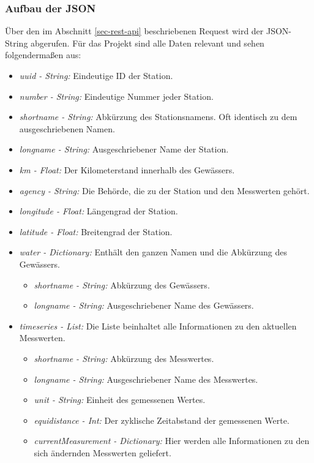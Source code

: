 \subsubsection{Aufbau der JSON}
\label{sec-struc-json}
Über den im Abschnitt \ref{sec-rest-api} beschriebenen Request wird der JSON-String abgerufen. Für das Projekt sind alle Daten relevant und sehen folgendermaßen aus:
\begin{itemize}
    \item \textit{uuid - String:} Eindeutige ID der Station.
    \item \textit{number - String:} Eindeutige Nummer jeder Station.
    \item \textit{shortname - String:} Abkürzung des Stationsnamens. Oft identisch zu dem ausgeschriebenen Namen.
    \item \textit{longname - String:} Ausgeschriebener Name der Station.
    \item \textit{km - Float:} Der Kilometerstand innerhalb des Gewässers.
    \item \textit{agency - String:} Die Behörde, die zu der Station und den Messwerten gehört.
    \item \textit{longitude - Float:} Längengrad der Station.
    \item \textit{latitude - Float:} Breitengrad der Station.
    \item \textit{water - Dictionary:} Enthält den ganzen Namen und die Abkürzung des Gewässers.
    \begin{itemize}
        \item \textit{shortname - String:} Abkürzung des Gewässers.
        \item \textit{longname - String:} Ausgeschriebener Name des Gewässers.
    \end{itemize}
    \item \textit{timeseries - List:} Die Liste beinhaltet alle Informationen zu den aktuellen Messwerten.
    \begin{itemize}
        \item \textit{shortname - String:} Abkürzung des Messwertes.
        \item \textit{longname - String:} Ausgeschriebener Name des Messwertes.
        \item \textit{unit - String:} Einheit des gemessenen Wertes.
        \item \textit{equidistance - Int:} Der zyklische Zeitabstand der gemessenen Werte.
        \item \textit{currentMeasurement - Dictionary:} Hier werden alle Informationen zu den sich ändernden Messwerten geliefert.

\end{itemize}
\end{itemize}
